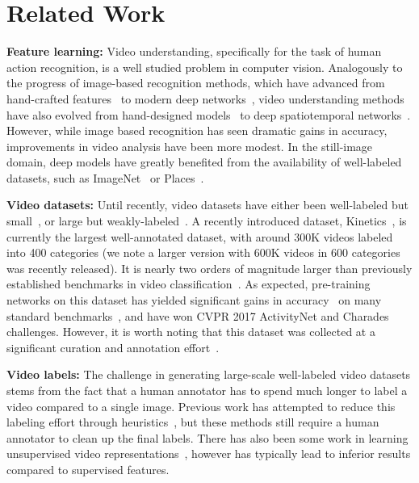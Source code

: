 \documentclass[10pt,twocolumn,letterpaper]{article}
\begin{document}
 \section{Related Work}\label{sec:relwork}

{\noindent \bf Feature learning:} Video understanding, specifically for the task of human action recognition, is a well studied
problem in computer vision. Analogously to the progress of image-based recognition methods, which have advanced
from hand-crafted features~\cite{lowe2004distinctive,Dalal05} to modern deep networks~\cite{Szegedy_16,He_16,Simonyan_14a},
video understanding methods have also evolved from hand-designed models~\cite{IDT_Wang_13,WangCVPR11,laptev2005space}
to deep spatiotemporal networks~\cite{Tran_15,Simonyan_14b}.
However, while image based recognition has seen dramatic gains in accuracy, improvements in video analysis have been
more modest. 
In the still-image domain, deep models have greatly benefited from the availability of well-labeled datasets, such as ImageNet~\cite{ImageNet} or Places~\cite{zhou2017places}.

{\noindent \bf Video datasets:} Until recently, video datasets have either been well-labeled but small~\cite{hmdb51,ucf101,charades},
or large but weakly-labeled~\cite{Karpathy_14,youtube8M}. A recently introduced dataset, Kinetics~\cite{kay2017kinetics},
is currently the largest well-annotated dataset, with around 300K videos labeled into 400 categories (we note a larger version with 600K videos in 600 categories was recently released).
It is  nearly
two orders of magnitude larger than previously established  benchmarks in video classification~\cite{hmdb51,ucf101}. As expected, pre-training
networks on this dataset has yielded significant gains in accuracy~\cite{carreira2017quo} on many standard benchmarks~\cite{hmdb51,ucf101,charades},
and have won CVPR 2017 ActivityNet and Charades challenges.
However, it is worth noting that this dataset was collected 
at a significant curation and annotation effort~\cite{kay2017kinetics}. 

{\noindent \bf Video labels:} The challenge in generating large-scale well-labeled video datasets stems from the fact that a human annotator has to spend much longer to label a  video compared to a single image. Previous work has attempted to reduce this labeling effort through heuristics~\cite{zhao2017slac}, 
but these methods still require a human annotator to clean up the final labels. There has also been some work in learning unsupervised video
representations~\cite{Sermanet2017TCN,misra2016unsupervised}, however has typically lead to inferior results compared to supervised features.
\end{document}
